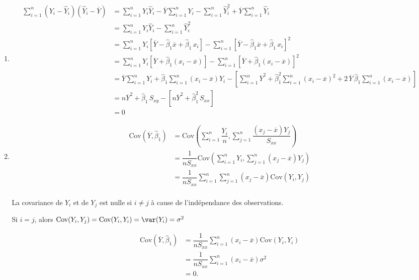 \documentclass[letter, 11pt]{article}
\begin{document}
\begin{enumerate}[leftmargin=*, wide, label=\bf Exercice \arabic*:]
{\begin{enumerate}
\item $$\begin{array}{ll}
    \sum\limits_{i=1}^n (Y_i-\widehat Y_i)(\widehat Y_i-\overline Y)
    &= \sum\limits_{i=1}^n Y_i\widehat Y_i- \overline Y\sum\limits_{i=1}^n Y_i- \sum\limits_{i=1}^n \hat Y^2_i+ \overline Y\sum\limits_{i=1}^n \widehat Y_i\\[6mm]
    &= \sum\limits_{i=1}^n Y_i\widehat Y_i-  \sum\limits_{i=1}^n \hat Y^2_i\\[6mm]
    &= \sum\limits_{i=1}^n Y_i [\overline Y - \widehat\beta_1\overline x +\widehat\beta_1\,x_i]- \sum\limits_{i=1}^n [\overline Y - \widehat\beta_1\overline x +\widehat\beta_1\,x_i]^2\\[6mm]
    &= \sum\limits_{i=1}^n Y_i [\overline Y +\widehat\beta_1(x_i-\overline x) ]- \sum\limits_{i=1}^n [\overline Y +\widehat\beta_1(x_i-\overline x) ]^2\\[6mm]
    &= \overline Y \sum\limits_{i=1}^n Y_i  +\widehat\beta_1\sum\limits_{i=1}^n(x_i-\overline x)Y_i -\left[ \sum\limits_{i=1}^n \overline Y^2 +\widehat\beta_1^2\sum\limits_{i=1}^n(x_i-\overline x)^2 + 2\,\overline Y\,\widehat\beta_1\sum\limits_{i=1}^n(x_i-\overline x)\right]\\[6mm]
    &= n\overline Y^2 +\widehat\beta_1\,S_{xy}  -\left[n \overline Y^2 +\widehat\beta_1^2\,S_{xx} \right]\\[6mm]
    &=0  
    \end{array}$$
\item  $$\begin{array}{ll}
    \text{Cov}(\overline Y,\widehat\beta_1)
    &=  \text{Cov}\left(\sum\limits_{i=1}^n\dfrac{Y_i}{n}, \sum\limits_{j=1}^n \dfrac{(x_j-\overline x)Y_j}{S_{xx}}\right) \\[6mm]
    &= \dfrac{1}{nS_{xx}}\text{Cov}\left(\sum\limits_{i=1}^n Y_i ,\sum\limits_{j=1}^n (x_j-\overline x)Y_j\right) \\[6mm]
    &= \dfrac{1}{nS_{xx}}\sum\limits_{i=1}^n\sum\limits_{j=1}^n (x_j-\overline x)\text{Cov}\left( Y_i ,Y_j\right) \\[3mm]
    \end{array}$$

    La covariance de $Y_i$ et de $Y_j$ est nulle si $i\ne j$ à cause de l'indépendance des observations.
    
    Si $i=j$, alors $\text{Cov}( Y_i ,Y_j)=\text{Cov}( Y_i ,Y_i)=\var(Y_i)=\sigma^2$

$$\begin{array}{ll}
    \text{Cov}(\overline Y,\widehat\beta_1)
    &= \dfrac{1}{nS_{xx}}\sum\limits_{i=1}^n(x_i-\overline x)\text{Cov}\left( Y_i ,Y_i\right) \\[6mm]
    &= \dfrac{1}{nS_{xx}}\sum\limits_{i=1}^n(x_i-\overline x)\sigma^2\\[6mm]
    &=0.
    \end{array}$$
    \end{enumerate}}




\end{enumerate}
\end{document}
